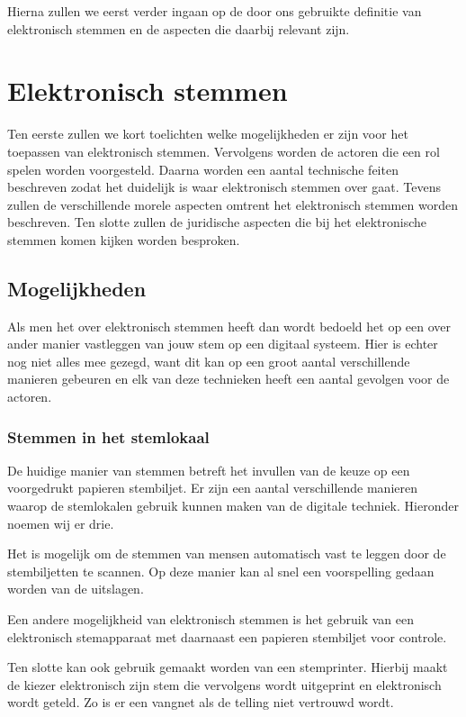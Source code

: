 \documentclass[a4paper]{article}
\begin{document}
Hierna zullen we eerst verder ingaan op de door ons gebruikte definitie van elektronisch stemmen en de aspecten die daarbij relevant zijn.

\newpage

\section{Elektronisch stemmen}
\label{text:elektronisch_stemmen}
Ten eerste zullen we kort toelichten welke mogelijkheden er zijn voor het toepassen van elektronisch stemmen. 
Vervolgens worden de actoren die een rol spelen worden voorgesteld. 
Daarna worden een aantal technische feiten beschreven zodat het duidelijk is waar elektronisch stemmen over gaat.
Tevens zullen de verschillende morele aspecten omtrent het elektronisch stemmen worden beschreven.
Ten slotte zullen de juridische aspecten die bij het elektronische stemmen komen kijken worden besproken.

\subsection{Mogelijkheden}
Als men het over elektronisch stemmen heeft dan wordt bedoeld het op een over ander manier vastleggen van jouw stem op een digitaal systeem.
Hier is echter nog niet alles mee gezegd, want dit kan op een groot aantal verschillende manieren gebeuren en elk van deze technieken heeft een aantal gevolgen voor de actoren. 

\subsubsection{Stemmen in het stemlokaal}
De huidige manier van stemmen betreft het invullen van de keuze op een voorgedrukt papieren stembiljet. 
Er zijn een aantal verschillende manieren waarop de stemlokalen gebruik kunnen maken van de digitale techniek.
Hieronder noemen wij er drie. 

Het is mogelijk om de stemmen van mensen automatisch vast te leggen door de stembiljetten te scannen.
Op deze manier kan al snel een voorspelling gedaan worden van de uitslagen. 

Een andere mogelijkheid van elektronisch stemmen is het gebruik van een elektronisch stemapparaat met daarnaast een papieren stembiljet voor controle.

Ten slotte kan ook gebruik gemaakt worden van een stemprinter. 
Hierbij maakt de kiezer elektronisch zijn stem die vervolgens wordt uitgeprint en elektronisch wordt geteld. 
Zo is er een vangnet als de telling niet vertrouwd wordt.
\end{document}
